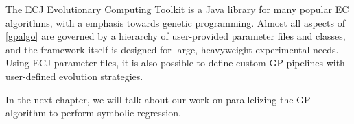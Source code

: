 The ECJ Evolutionary Computing Toolkit\citep{Luke1998ECJSoftware} is a Java library for many popular EC algorithms, with a emphasis towards genetic programming. Almost all aspects of \cref{gpalgo} are governed by a hierarchy of user-provided parameter files and classes, and the framework itself is designed for large, heavyweight experimental needs. Using ECJ parameter files, it is also possible to define custom GP pipelines with user-defined evolution strategies.

In the next chapter, we will talk about our work on parallelizing the GP algorithm to perform symbolic regression.